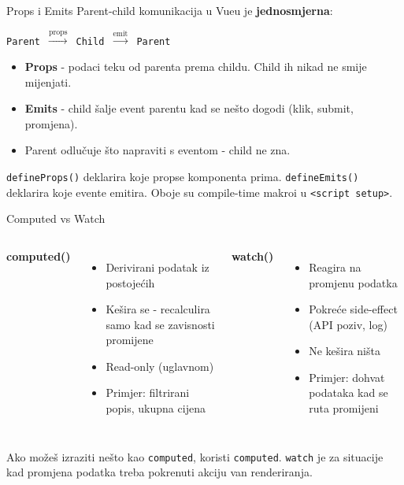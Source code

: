 \begin{frame}{Props i Emits}
Parent-child komunikacija u Vueu je \textbf{jednosmjerna}:

\vspace{0.6em}
\begin{center}
\texttt{Parent $\xrightarrow{\text{props}}$ Child $\xrightarrow{\text{emit}}$ Parent}
\end{center}

\vspace{0.6em}
\begin{itemize}
  \item \textbf{Props} - podaci teku od parenta prema childu. Child ih nikad ne smije mijenjati.
  \item \textbf{Emits} - child šalje event parentu kad se nešto dogodi (klik, submit, promjena).
  \item Parent odlučuje što napraviti s eventom - child ne zna.
\end{itemize}

\vspace{0.6em}
\texttt{defineProps()} deklarira koje propse komponenta prima. \texttt{defineEmits()} deklarira koje evente emitira. Oboje su compile-time makroi u \texttt{<script setup>}.
\end{frame}

\begin{frame}{Computed vs Watch}
\begin{columns}[T]
\textbf{computed()}
\begin{itemize}
  \item Derivirani podatak iz postojećih
  \item Kešira se - recalculira samo kad se zavisnosti promijene
  \item Read-only (uglavnom)
  \item Primjer: filtrirani popis, ukupna cijena
\end{itemize}

\textbf{watch()}
\begin{itemize}
  \item Reagira na promjenu podatka
  \item Pokreće side-effect (API poziv, log)
  \item Ne kešira ništa
  \item Primjer: dohvat podataka kad se ruta promijeni
\end{itemize}
\end{columns}

\vspace{0.6em}
Ako možeš izraziti nešto kao \texttt{computed}, koristi \texttt{computed}. \texttt{watch} je za situacije kad promjena podatka treba pokrenuti akciju van renderiranja.
\end{frame}

